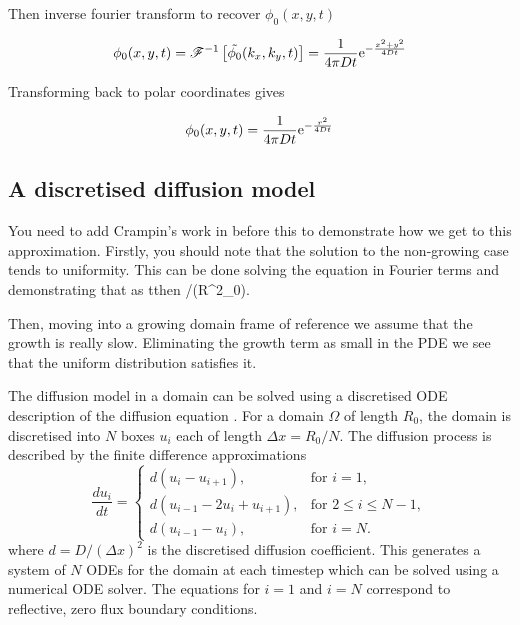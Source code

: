 Then inverse fourier transform to recover $\phi_0(x,y,t)$

\begin{equation}
  \phi_0(x,y,t) = \mathscr{F}^{-1}\left[\tilde{\phi_0}(k_x,k_y,t)\right] = \frac{1}{4\pi Dt}\mathrm{e}^{-\frac{x^2 + y^2}{4Dt}} \\
\end{equation}

Transforming back to polar coordinates gives

\begin{equation}
  \phi_0(x,y,t) = \frac{1}{4\pi Dt}\mathrm{e}^{-\frac{r^2}{4Dt}} \\
  \label{eqn:phi_0}
\end{equation}


\subsection{A discretised diffusion model} \label{discretised_model}


You need to add Crampin's work in before this to demonstrate how we get to this approximation. Firstly, you should note that the solution to the non-growing case tends to uniformity. This can be done solving the equation in Fourier terms and demonstrating that as t\rightarrow\infty then \phi {}/(\pi R^2_0).

Then, moving into a growing domain frame of reference we assume that the growth is really slow. Eliminating the growth term as small in the PDE we see that the uniform distribution satisfies it.

The diffusion model in a domain can be solved using a discretised ODE
description of the diffusion equation \cite{woolley2011stochastic}. For a domain
$\Omega$ of length $R_0$, the domain is discretised into $N$ boxes $u_i$ each of
length $\Delta x=R_0/N$. The diffusion process is described by the finite
difference approximations
%
\begin{equation}
\frac{du_i}{dt} = \begin{cases}
		d(u_i - u_{i+1}), & \text{for } i = 1, \\
		d(u_{i-1}-2u_i +u_{i+1}), & \text{for } 2 \leq i \leq N-1, \\
		d(u_{i-1}-u_i), & \text{for } i = N .
		\end{cases}
\end{equation}
%
where $d = D/(\Delta x)^2$ is the discretised diffusion coefficient.
%
This generates a system of $N$ ODEs for the domain at each timestep which can be
 solved using a numerical ODE solver. The equations for $i=1$ and $i=N$
 correspond to reflective, zero flux boundary conditions.

